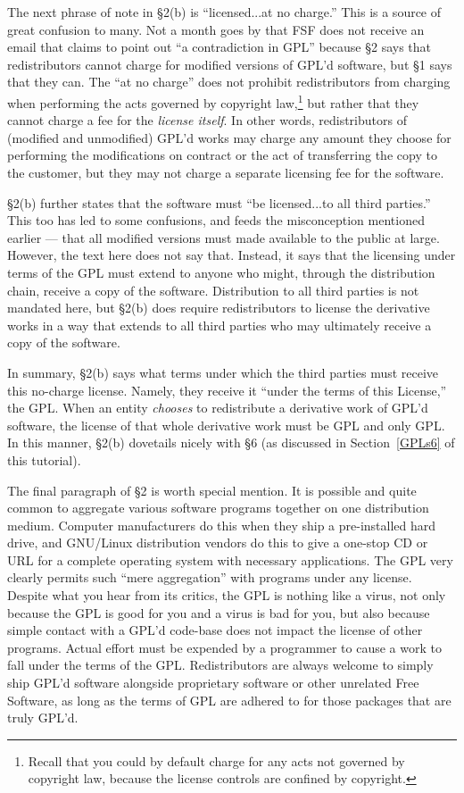 \documentclass[11pt, letterpaper]{book}
\begin{document}
\medskip

The next phrase of note in \S 2(b) is ``licensed...at no charge.''
This is a source of great confusion to many. Not a month goes by that
FSF does not receive an email that claims to point out ``a
contradiction in GPL'' because \S 2 says that redistributors cannot
charge for modified versions of GPL'd software, but \S 1 says that
they can. The ``at no charge'' does not prohibit redistributors from
charging when performing the acts governed by copyright
law,\footnote{Recall that you could by default charge for any acts not
governed by copyright law, because the license controls are confined
by copyright.} but rather that they cannot charge a fee for the
\emph{license itself}. In other words, redistributors of (modified
and unmodified) GPL'd works may charge any amount they choose for
performing the modifications on contract or the act of transferring
the copy to the customer, but they may not charge a separate licensing
fee for the software.

\S 2(b) further states that the software must ``be licensed...to all
third parties.''  This too has led to some confusions, and feeds the
misconception mentioned earlier --- that all modified versions must made
available to the public at large. However, the text here does not say
that. Instead, it says that the licensing under terms of the GPL must
extend to anyone who might, through the distribution chain, receive a copy
of the software. Distribution to all third parties is not mandated here,
but \S 2(b) does require redistributors to license the derivative works in
a way that extends to all third parties who may ultimately receive a
copy of the software.

In summary, \S 2(b) says what terms under which the third parties must
receive this no-charge license. Namely, they receive it ``under the terms
of this License,'' the GPL. When an entity \emph{chooses} to redistribute
a derivative work of GPL'd software, the license of that whole derivative
work must be GPL and only GPL\@. In this manner, \S 2(b) dovetails nicely
with \S 6 (as discussed in Section~\ref{GPLs6} of this tutorial).

\medskip

The final paragraph of \S 2 is worth special mention. It is possible and
quite common to aggregate various software programs together on one
distribution medium. Computer manufacturers do this when they ship a
pre-installed hard drive, and GNU/Linux distribution vendors do this to
give a one-stop CD or URL for a complete operating system with necessary
applications. The GPL very clearly permits such ``mere aggregation'' with
programs under any license. Despite what you hear from its critics, the
GPL is nothing like a virus, not only because the GPL is good for you and
a virus is bad for you, but also because simple contact with a GPL'd
code-base does not impact the license of other programs. Actual effort
must be expended by a programmer to cause a work to fall under the terms
of the GPL. Redistributors are always welcome to simply ship GPL'd
software alongside proprietary software or other unrelated Free Software,
as long as the terms of GPL are adhered to for those packages that are
truly GPL'd.
\end{document}
